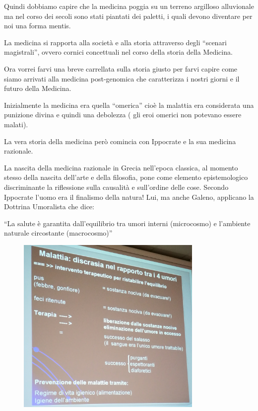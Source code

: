   Quindi dobbiamo capire che la medicina poggia su un terreno argilloso
  alluvionale ma nel corso dei secoli sono stati piantati dei paletti, i
  quali devono diventare per noi una forma mentis.

  La medicina si rapporta alla società e alla storia attraverso degli
  ``scenari magistrali'', ovvero cornici concettuali nel corso della
  storia della Medicina.

  Ora vorrei farvi una breve carrellata sulla storia giusto per farvi
  capire come siamo arrivati alla medicina post-genomica che
  caratterizza i nostri giorni e il futuro della Medicina.

  Inizialmente la medicina era quella ``omerica'' cioè la malattia era
  considerata una punizione divina e quindi una debolezza ( gli eroi
  omerici non potevano essere malati).

  La vera storia della medicina però comincia con Ippocrate e la sua
  medicina razionale.

  La nascita della medicina razionale in Grecia nell'epoca classica, al
  momento stesso della nascita dell'arte e della filosofia, pone come
  elemento epistemologico discriminante la riflessione sulla causalità e
  sull'ordine delle cose. Secondo Ippocrate l'uomo era il finalismo
  della natura! Lui, ma anche Galeno, applicano la Dottrina Umoralista
  che dice:

  ``La salute è garantita dall'equilibrio tra umori interni (microcosmo)
  e l'ambiente naturale circostante (macrocosmo)''

  \begin{figure}[!ht]
\centering
	\includegraphics[width=0.8\textwidth]{33/image2.jpeg}
	\end{figure}

